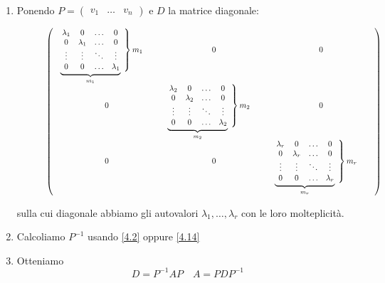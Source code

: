 \documentclass[a4paper]{article}
\theoremstyle{break}
\theoremstyle{break}
\theoremstyle{break}
\theoremstyle{break}
\newcommand\scalemath[2]{\scalebox{#1}{\mbox{\ensuremath{\displaystyle #2}}}}
\begin{document}
\begin{enumerate}
  \item Ponendo \( P = \begin{pmatrix} v_1 & \ldots & v_n \end{pmatrix}  \) e \( D \) la
    matrice diagonale:
    \begin{figure}[H]
      \[
        \scalemath{0.8}{
          \left(
            \begin{array}{ccc}
              \kern .4em
              \underbrace{
                \kern-.4em
                \left.
                  \begin{array}{cccc}
                    \lambda_1 & 0 & \ldots & 0\\
                    0 & \lambda_1 & \ldots & 0\\
                    \vdots & \vdots & \ddots & \vdots\\
                    0 & 0 & \ldots & \lambda_1
                  \end{array}
                \right\} m_1 
                \kern -2.8em
              }_{m_1}
              \kern 4.5em
      & 0
      & 0 \\
              0 &
              \kern .4em
              \underbrace{
                \kern-.4em
                \left.
                  \begin{array}{cccc}
                    \lambda_2 & 0 & \ldots & 0\\
                    0 & \lambda_2 & \ldots & 0\\
                    \vdots & \vdots & \ddots & \vdots\\
                    0 & 0 & \ldots & \lambda_2
                  \end{array}
                \right\} m_2 
                \kern -2.8em
              }_{m_2}
              \kern 4.5em
                & 0 \\
              0 & 0 &
              \kern .4em
              \underbrace{
                \kern-.4em
                \left.
                  \begin{array}{cccc}
                    \lambda_r & 0 & \ldots & 0\\
                    0 & \lambda_r & \ldots & 0\\
                    \vdots & \vdots & \ddots & \vdots\\
                    0 & 0 & \ldots & \lambda_r
                  \end{array}
                \right\} m_r 
                \kern -2.8em
              }_{m_r}
              \kern 4.5em
            \end{array}
          \right)
        }
      \] 
    \end{figure}

    \noindent sulla cui diagonale abbiamo gli autovalori \( \lambda_1, \ldots, \lambda_r \) 
    con le loro molteplicità.

  \item Calcoliamo \( P^{-1} \) usando \ref{4.2} oppure \ref{4.14}

  \item Otteniamo
    \[
    D = P^{-1}AP \quad A = PDP^{-1}
    \] 
\end{enumerate}
\end{document}
